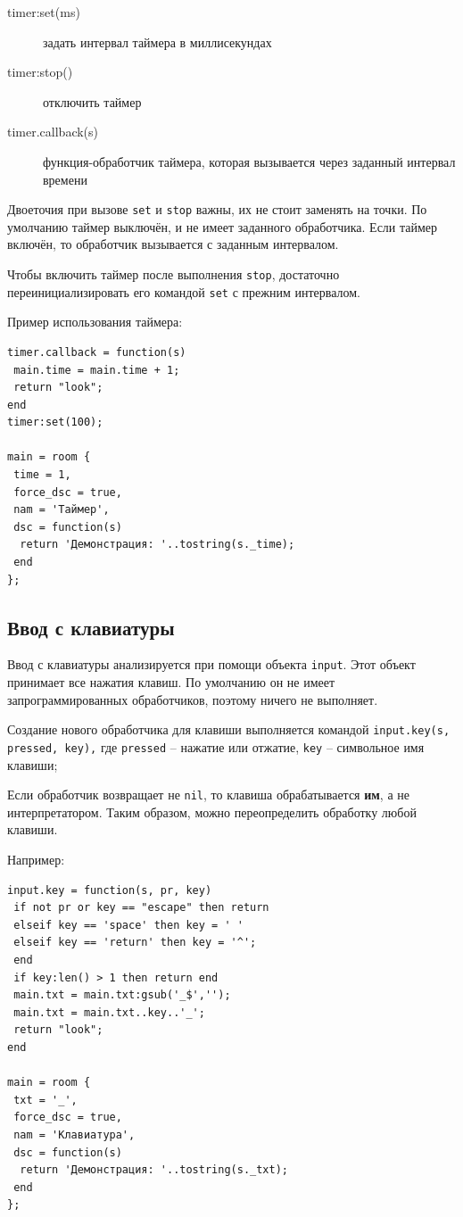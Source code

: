 \documentclass[a4paper,12pt]{article}
\begin{document}
\begin{description}
\item[timer:set(ms)] задать интервал таймера в миллисекундах
\item[timer:stop()] отключить таймер
\item[timer.callback(s)] функция-обработчик таймера, которая вызывается через заданный интервал времени
\end{description}

Двоеточия при вызове \verb/set/ и \verb/stop/ важны, их не стоит заменять на точки. По умолчанию таймер выключён, и не имеет заданного обработчика. Если таймер включён, то обработчик вызывается с заданным интервалом.

Чтобы включить таймер после выполнения \verb/stop/, достаточно переинициализировать его командой \verb/set/ с прежним интервалом.

Пример использования таймера: 

\begin{verbatim}
timer.callback = function(s) 
 main.time = main.time + 1;   
 return "look"; 
end 
timer:set(100); 

main = room { 
 time = 1, 
 force_dsc = true, 
 nam = 'Таймер', 
 dsc = function(s) 
  return 'Демонстрация: '..tostring(s._time); 
 end
}; 
\end{verbatim}

\subsection{Ввод с клавиатуры}
\label{objects_input}
Ввод с клавиатуры анализируется при помощи объекта \verb/input/. Этот объект принимает все нажатия клавиш. По умолчанию он не имеет запрограммированных обработчиков, поэтому ничего не выполняет.

Создание нового обработчика для клавиши выполняется командой \verb/input.key(s, pressed, key),/ где \verb/pressed/ -- нажатие или отжатие, \verb/key/ -- символьное имя клавиши;

Если обработчик возвращает не \verb/nil/, то клавиша обрабатывается \textbf{им}, а не интерпретатором. Таким образом, можно переопределить обработку любой клавиши.

Например: 

\begin{verbatim}
input.key = function(s, pr, key) 
 if not pr or key == "escape" then return  
 elseif key == 'space' then key = ' '  
 elseif key == 'return' then key = '^'; 
 end  
 if key:len() > 1 then return end  
 main.txt = main.txt:gsub('_$',''); 
 main.txt = main.txt..key..'_'; 
 return "look"; 
end

main = room { 
 txt = '_', 
 force_dsc = true, 
 nam = 'Клавиатура', 
 dsc = function(s) 
  return 'Демонстрация: '..tostring(s._txt); 
 end  
}; 
\end{verbatim}
\end{document}
